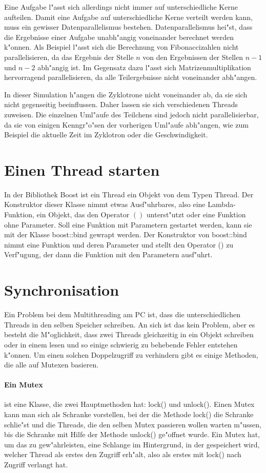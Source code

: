 \documentclass[14pt, a4paper]{report}
\begin{document}
Eine Aufgabe l"asst sich allerdings nicht immer auf unterschiedliche Kerne aufteilen.
Damit eine Aufgabe auf unterschiedliche Kerne verteilt werden kann, muss ein gewisser
Datenparallelismus bestehen. Datenparallelismus hei"st, dass die Ergebnisse einer Aufgabe
unabh"angig voneinander berechnet werden k"onnen. Als Beispiel l"asst sich die
Berechnung von Fibonaccizahlen nicht parallelisieren, da das Ergebnis der Stelle $n$ von
den Ergebnissen der Stellen $n-1$ und $n-2$ abh"angig ist. Im Gegensatz dazu l"asst sich
Matrizenmultiplikation hervorragend parallelisieren, da alle Teilergebnisse nicht voneinander
abh"angen.

In dieser Simulation h"angen die Zyklotrone nicht voneinander ab, da sie sich nicht
gegenseitig beeinflussen. Daher lassen sie sich verschiedenen Threads zuweisen. Die
einzelnen Uml"aufe des Teilchens sind jedoch nicht parallelisierbar, da sie von einigen
Kenngr"o"sen der vorherigen Uml"aufe abh"angen, wie zum Beispiel die aktuelle Zeit 
im Zyklotron oder die Geschwindigkeit.

\section{Einen Thread starten}
In der Bibliothek Boost ist ein Thread ein Objekt von dem Typen Thread. Der
Konstruktor dieser Klasse nimmt etwas Ausf"uhrbares, also eine Lambda-Funktion,
ein Objekt, das den Operator $()$ unterst"utzt oder eine Funktion ohne Parameter.
Soll eine Funktion mit Parametern gestartet werden, kann sie mit der Klasse
boost::bind gewrapt werden. Der Konstruktor von boost::bind nimmt eine Funktion und deren
Parameter und stellt den Operator () zu Verf"ugung, der dann die Funktion mit den 
Parametern ausf"uhrt.

\section{Synchronisation} \label{Synchronisation}
Ein Problem bei dem Multithreading am PC ist, dass die unterschiedlichen Threads in den
selben Speicher schreiben. An sich ist das kein Problem, 
aber es besteht die M"oglichkeit,
dass zwei Threads gleichzeitig in ein Objekt schreiben oder in einem lesen und so einige
schwierig zu behebende Fehler entstehen k"onnen. Um einen solchen Doppelzugriff zu 
verhindern gibt es einige Methoden, die alle auf Mutexen basieren.

\paragraph{Ein Mutex} ist eine Klasse, die zwei Hauptmethoden hat: lock() und unlock(). Einen
Mutex kann man sich als Schranke vorstellen, bei der die Methode lock() die Schranke schlie"st
und die Threads, die den selben Mutex passieren wollen warten m"ussen, bis die Schranke
mit Hilfe der Methode unlock() ge"offnet wurde. Ein Mutex hat, um das zu gew"ahrleisten, eine
Schlange im Hintergrund, in der gespeichert wird, welcher Thread als erstes den Zugriff
erh"alt, also als erstes mit lock() nach Zugriff verlangt hat. 
\end{document}
